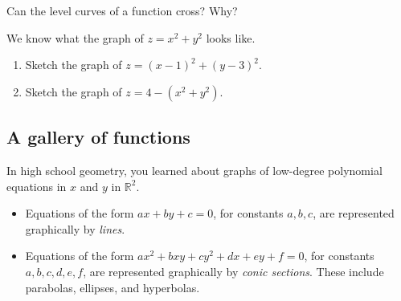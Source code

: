 \vfill\vfill 

\begin{ex}
    Can the level curves of a function cross? Why?    
\end{ex}

\vspace{.5in} 

\begin{ex}\label{ex:shift-bowl}
    We know what the graph of $z=x^2+y^2$ looks like. 
    \begin{enumerate} 
    \item 
    Sketch the graph of $z=(x-1)^2+(y-3)^2$. 
    \item 
    Sketch the graph of $z=4-(x^2+y^2)$.
    \end{enumerate}
\end{ex}

\vfill

\pagebreak

\subsection{A gallery of functions}
In high school geometry, you learned about graphs of low-degree polynomial equations in $x$ and $y$ in $\mathbb{R}^2$.
\begin{itemize} 
    \item Equations of the form $ax+by+c=0$, for constants $a,b,c$, are represented graphically by \emph{lines}. 
    \item Equations of the form $ax^2+bxy+cy^2+dx+ey+f=0$, for constants $a,b,c,d,e,f$, are represented graphically by \emph{conic sections}. These include parabolas, ellipses, and hyperbolas.
\end{itemize}

